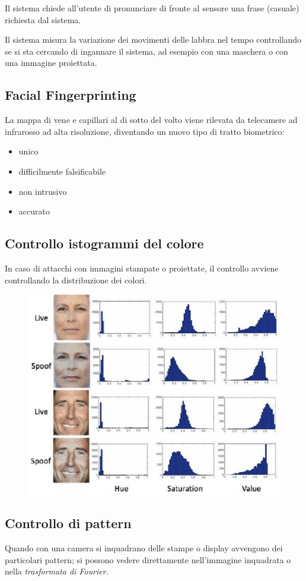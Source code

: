 \documentclass{report}
\begin{document}
Il sistema chiede all'utente di pronunciare
di fronte al sensore una frase (casuale) richiesta dal sistema.

\noindent Il sistema misura la variazione dei movimenti delle labbra 
nel tempo controllando se si sta cercando di ingannare il sistema, 
ad esempio con una maschera o con una immagine proiettata.

\subsection{Facial Fingerprinting}
La mappa di vene e capillari al di sotto del volto viene rilevata 
da telecamere ad infrarosso ad alta risoluzione, diventando un nuovo 
tipo di tratto biometrico:
\begin{itemize}
    \item unico 
    \item difficilmente falsificabile 
    \item non intrusivo
    \item accurato
\end{itemize}

\subsection{Controllo istogrammi del colore}
In caso di attacchi con immagini stampate o proiettate, il controllo 
avviene controllando la distribuzione dei colori.

\begin{figure}[ht]
    \centering
    \includegraphics[width=0.8\linewidth]{images/isto.png}
\end{figure}

\subsection{Controllo di pattern}
Quando con una camera si inquadrano delle stampe o display 
avvengono dei particolari pattern; si possono vedere direttamente 
nell'immagine inquadrata o nella \textit{trasformata di Fourier}.
\end{document}
